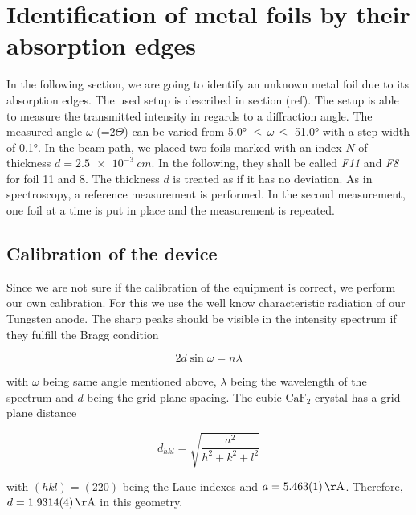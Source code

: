 \section{Identification of metal foils by their absorption edges}
\label{sec:absorb}

In the following section, we are going to identify an unknown metal foil due to its absorption edges. The used setup is described in section (ref).
The setup is able to measure the transmitted intensity in regards to a diffraction angle. The measured angle $\omega$ (=$2\Theta$) can be varied from 
5.0° $\leqslant \, \omega \, \leqslant$ 51.0° with a step width of 0.1°. In the beam path, we placed two foils marked with an index $N$ of thickness $d = \SI{2.5e-3}{cm}$. In the following, they shall be called \textit{F11} and \textit{F8} for foil 11 and 8.
The thickness $d$ is treated as if it has no deviation. As in spectroscopy, a reference measurement is performed. In the 
second measurement, one foil at a time is put in place and the measurement is repeated. 

\subsection{Calibration of the device}

Since we are not sure if the calibration of the equipment is correct, we perform our own calibration.
For this we use the well know characteristic radiation of our Tungsten anode. The sharp peaks should be visible in the 
intensity spectrum if they fulfill the Bragg condition

\begin{equation}
    2 d \sin{\omega} = n \lambda
\end{equation}

with $\omega$ being same angle mentioned above, $ \lambda $ being the wavelength of the spectrum and $d$ being the grid plane spacing. The cubic $\mathrm{CaF}_2$ crystal has a 
grid plane distance 

\begin{equation}
    d_{hkl} = \sqrt{\frac{a^2}{h^2+k^2+l^2}}
\end{equation}

with $(hkl) = (220) $ being the Laue indexes and $a = \SI{5.463 \pm 0.001 }{\AA}$. Therefore, $d = \SI{1.9314 \pm 0.0004}{\AA} $ in this geometry.

